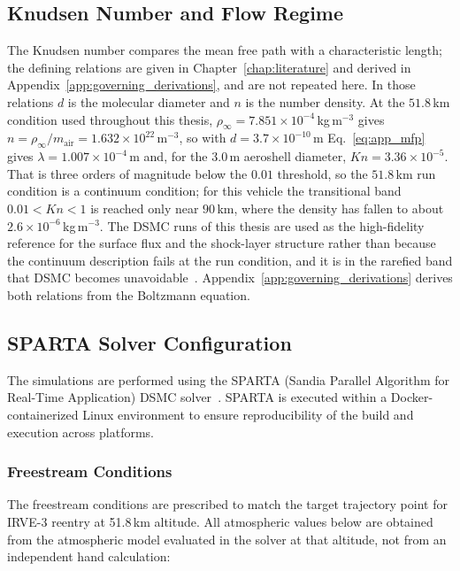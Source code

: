 \subsection{Knudsen Number and Flow Regime}
The Knudsen number compares the mean free path with a characteristic length; the defining relations are given in Chapter~\ref{chap:literature} and derived in Appendix~\ref{app:governing_derivations}, and are not repeated here. In those relations $d$ is the molecular diameter and $n$ is the number density. At the $51.8$\,km condition used throughout this thesis, $\rho_\infty = 7.851\times10^{-4}$\,kg\,m$^{-3}$ gives $n = \rho_\infty/m_{\mathrm{air}} = 1.632\times10^{22}$\,m$^{-3}$, so with $d = 3.7\times10^{-10}$\,m Eq.~\eqref{eq:app_mfp} gives $\lambda = 1.007\times10^{-4}$\,m and, for the $3.0$\,m aeroshell diameter, $Kn = 3.36\times10^{-5}$. That is three orders of magnitude below the $0.01$ threshold, so the $51.8$\,km run condition is a continuum condition; for this vehicle the transitional band $0.01 < Kn < 1$ is reached only near $90$\,km, where the density has fallen to about $2.6\times10^{-6}$\,kg\,m$^{-3}$. The DSMC runs of this thesis are used as the high-fidelity reference for the surface flux and the shock-layer structure rather than because the continuum description fails at the run condition, and it is in the rarefied band that DSMC becomes unavoidable~\cite{bird1994molecular,tsien1946}. Appendix~\ref{app:governing_derivations} derives both relations from the Boltzmann equation.

\subsection{SPARTA Solver Configuration}
The simulations are performed using the SPARTA (Sandia Parallel Algorithm for Real-Time Application) DSMC solver~\cite{plimpton2014sparta}. SPARTA is executed within a Docker-containerized Linux environment to ensure reproducibility of the build and execution across platforms.

\subsubsection*{Freestream Conditions}
The freestream conditions are prescribed to match the target trajectory point for IRVE-3 reentry at 51.8\,km altitude. All atmospheric values below are obtained from the atmospheric model evaluated in the solver at that altitude, not from an independent hand calculation:

